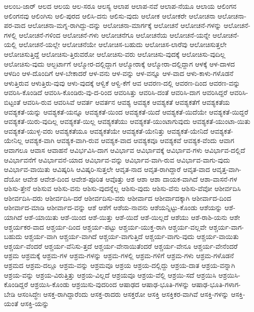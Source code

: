 {ಆಲಂಬ-ಜಾರ್
ಆಲದ
ಆಲಯ
ಆಲ-ಸರೂ
ಆಲಸ್ಯ
ಆಲಾಪ
ಆಲಾಪ-ನವೆ
ಆಲಾಪ-ನೆಯೂ
ಆಲಾಯ
ಆಲಿಂಗನ
ಆಲಿಂಗನವು
ಆಲಿಂಗಿಸು
ಆಲಿ-ಪುರದ
ಆಲಿಸಿ-ದನು
ಆಲಿಸು-ವುದು
ಆಲೋಕ
ಆಲೋಕರೇ
ಆಲೋಚನಾ
ಆಲೋಚನಾ-ಪರ-ವಾದ
ಆಲೋಚನಾ-ಮಗ್ನ-ರಾಗಿದ್ದು-ದನ್ನು
ಆಲೋಚನಾ-ಮಾರ್ಗಕ್ಕೆ
ಆಲೋಚನೆ
ಆಲೋಚನೆ-ಗಳನ್ನು
ಆಲೋಚನೆ-ಗಳಲ್ಲಿ
ಆಲೋಚನೆ-ಗಳಿಂದ
ಆಲೋಚನೆ-ಗಳು
ಆಲೋಚನೆಗೂ
ಆಲೋಚನೆಯ
ಆಲೋಚನೆ-ಯನ್ನೇ
ಆಲೋಚನೆ-ಯಲ್ಲಿ
ಆಲೋಚನೆ-ಯಲ್ಲೇ
ಆಲೋಚನೆಯೇ
ಆಲೋಚಿಸ-ಬಹುದು
ಆಲೋಚಿಸ-ಲಾರೆವು
ಆಲೋಚಿಸುತ್ತಲೇ
ಆಲೋಚಿಸುತ್ತಿದ್ದೆ
ಆಲೋಚಿಸು-ತ್ತಿರುವರೋ
ಆಲೋಚಿಸು-ವರು
ಆಲೋಚಿಸು-ವುದಕ್ಕೆ
ಆಲೋಚಿಸು-ವುದಿಲ್ಲ
ಆಲೋಚಿಸು-ವುದು
ಆಲ್ಬರ್ಟಾಗೆ
ಆಲ್ಮೋರ-ದಲ್ಲಿದ್ದಾಗ
ಆಲ್ಮೋರಾಕ್ಕೆ
ಆಲ್ಮೋರಾ-ದಲ್ಲಿದ್ದಾಗ
ಆಳಕ್ಕೆ
ಆಳ-ದಾಳದ
ಆಳದಿಂ
ಆಳ-ದೊಂದಿಗೆ
ಆಳ-ಬೇಕಾದರೆ
ಆಳ-ವನು
ಆಳ-ವನ್ನು
ಆಳ-ವನ್ನೂ
ಆಳ-ವಾದ
ಆಳು-ಕಾಳು-ಗಳೊಡನೆ
ಆಳುತ್ತಿರುವ
ಆಳುತ್ತಿರು-ವುವು
ಆಳು-ವುದಕ್ಕೆ
ಆಳ್ವಿಕೆ
ಆಳ್ವಿ-ಕೆಗೆ
ಆವ
ಆವರಣ-ದಲ್ಲಿ
ಆವರಣ-ದಿಂದ
ಆವರಣ-ವನ್ನು
ಆವರಿಸಿ-ಕೊಂಡಿದೆ
ಆವರಿಸಿ-ಕೊಂಡಿರು-ವು-ದ-ರಿಂದ
ಆವರಿಸಿತ್ತು
ಆವರಿಸಿ-ದಂತೆ
ಆವರಿಸಿ-ದಾಗ
ಆವರಿಸಿದ್ದರೆ
ಆವರಿಸಿ-ಬಿಟ್ಟಂತೆ
ಆವರಿಸಿ-ರುವ
ಆವರಿಸಿವೆ
ಆವರ್ತ
ಆವರ್ತನ
ಆವಶ್ಯ
ಆವಶ್ಯಕ
ಆವಶ್ಯಕತೆ
ಆವಶ್ಯಕತೆಗೆ
ಆವಶ್ಯಕತೆಯ
ಆವಶ್ಯಕತೆ-ಯನ್ನು
ಆವಶ್ಯಕತೆ-ಯನ್ನೂ
ಆವಶ್ಯಕತೆ-ಯಿಂದ
ಆವಶ್ಯಕತೆ-ಯಿದೆ
ಆವಶ್ಯಕತೆ-ಯಿದೆಯೇ
ಆವಶ್ಯಕತೆ-ಯಿದ್ದರೆ
ಆವಶ್ಯಕತೆ-ಯಿರು-ವುದಿಲ್ಲ
ಆವಶ್ಯಕತೆ-ಯಿಲ್ಲ
ಆವಶ್ಯಕತೆಯು
ಆವಶ್ಯಕತೆ-ಯುಂಟಾಗುವುದು
ಆವಶ್ಯಕತೆ-ಯುಂಟಾ-ಯಿತು
ಆವಶ್ಯಕತೆ-ಯುಳ್ಳ-ವರು
ಆವಶ್ಯಕತೆಯೂ
ಆವಶ್ಯಕತೆಯೇ
ಆವಶ್ಯಕತೆ-ಯೇನಿತ್ತು
ಆವಶ್ಯಕತೆ-ಯೇನಿದೆ
ಆವಶ್ಯಕತೆ-ಯೇನಿಲ್ಲ
ಆವಶ್ಯಕ-ವಾಗಿ
ಆವಶ್ಯಕ-ವಾಗಿ-ರುವ
ಆವಶ್ಯಕ-ವಾದ
ಆವಶ್ಯಕವೂ
ಆವಶ್ಯಕವೆ
ಆವಶ್ಯಕ-ವೆಂದು
ಆವಾಗ
ಆವಾಗಲೂ
ಆವಾಸ
ಆವಾಹನೆ
ಆವಿರ್ಭವಿಸಿ-ದಾಗ
ಆವಿರ್ಭಾವ
ಆವಿರ್ಭಾವಕ್ಕೆ
ಆವಿರ್ಭಾವ-ಗಳು
ಆವಿರ್ಭಾವ-ದಲ್ಲಿದೆ
ಆವಿರ್ಭಾವನೆಗೆ
ಆವಿರ್ಭಾವನೆ-ಯಾದ
ಆವಿರ್ಭಾವ-ವನ್ನು
ಆವಿರ್ಭಾವ-ವಾಗಿ-ರುವ
ಆವಿರ್ಭಾವ-ವಾಗು-ವುದು
ಆವಿರ್ಭಾವ-ವಾಯಿತು
ಆವಿಷ್ಕರಿಸಿ
ಆವಿಷ್ಕರಿ-ಸುತ್ತಲೇ
ಆವೃತ-ನಾದ
ಆವೃತ-ರಾಗಿದ್ದಾರೆ
ಆವೃತ-ವಾದ
ಆವೃತ್ತ-ವಾಗಿ-ದೆಯೋ
ಆವೇಶ
ಆವೇಶ-ದಿಂದ
ಆವೇಶ-ಪೂರಿತ
ಆವೊತ್ತು
ಆಶ
ಆಶಾ
ಆಶಾ ದಾಯಕ-ವಾಗಿದೆ
ಆಶಾ-ವಾಸನೆ-ಗಳ
ಆಶಿಸು-ತ್ತೇನೆ
ಆಶಿಸುವ
ಆಶಿಸು-ವನು
ಆಶಿಸು-ವುದನ್ನೆಲ್ಲ
ಆಶಿಸು-ವುದು
ಆಶಿಸು-ವೆನು
ಆಶಿಸು-ವೆವೋ
ಆಶೀರ್ವದಿಸಿ
ಆಶೀರ್ವದಿಸಿ-ದರು
ಆಶೀರ್ವದಿಸಿ-ದರೆ
ಆಶೀರ್ವದಿಸು-ವರು
ಆಶೀರ್ವಾದ
ಆಶೀರ್ವಾದಕ್ಕಾಗಿ
ಆಶೀರ್ವಾದ-ದಿಂದ
ಆಶೀರ್ವಾದ-ಮಾಡಿ
ಆಶೀರ್ವಾದ-ವನ್ನು
ಆಶೆ
ಆಶೆಗೆ
ಆಶೆಯ-ನಾವನು
ಆಶೆಯನ್ನಿಟ್ಟು-ಕೊಂಡು
ಆಶೆಯನ್ನು
ಆಶೆ-ಯಾಗಿದೆ
ಆಶೆ-ಯಾಯಿತು
ಆಶೆ-ಯಿಂದ
ಆಶೆ-ಯಿತ್ತು
ಆಶೆ-ಯಿದೆ
ಆಶೆ-ಯಿಲ್ಲದೆ
ಆಶೆಯು
ಆಶೆ-ರಾಶಿ-ಯನು
ಆಶೇ
ಆಶ್ಚರ್ಯಕರ-ವಾದ
ಆಶ್ಚರ್ಯ-ದಿಂದ
ಆಶ್ಚರ್ಯ-ಪಟ್ಟು
ಆಶ್ಚರ್ಯ-ಯುಕ್ತ-ರಾಗಿ
ಆಶ್ಚರ್ಯ-ವಲ್ಲವೇ
ಆಶ್ಚರ್ಯ-ವಾಗ-ಬಹುದು
ಆಶ್ಚರ್ಯ-ವಾಗಿ
ಆಶ್ಚರ್ಯ-ವಾಗಿದೆ
ಆಶ್ಚರ್ಯ-ವಾಗುತ್ತಿದೆ
ಆಶ್ಚರ್ಯ-ವಾಗು-ವುದು
ಆಶ್ಚರ್ಯ-ವಾಯಿತು
ಆಶ್ಚರ್ಯ-ವೆಂದರೆ
ಆಶ್ಚರ್ಯ-ವೆನಿಸು-ತ್ತದೆ
ಆಶ್ಚರ್ಯ-ವೇನಾಯಿತೆಂದರೆ
ಆಶ್ಚರ್ಯ-ವೇನೂ
ಆಶ್ಚರ್ಯ-ವೇನೆಂದರೆ
ಆಶ್ರಮ
ಆಶ್ರಮಕ್ಕೆ
ಆಶ್ರಮ-ಗಳ
ಆಶ್ರಮ-ಗಳನ್ನು
ಆಶ್ರಮ-ಗಳಲ್ಲಿ
ಆಶ್ರಮ-ಗಳಿಗೆ
ಆಶ್ರಮ-ಗಳು
ಆಶ್ರಮ-ಗಳೊಡನೆ
ಆಶ್ರಮದ
ಆಶ್ರಮ-ದಲ್ಲೂ
ಆಶ್ರಮ-ವನ್ನು
ಆಶ್ರಮವೂ
ಆಶ್ರಯ
ಆಶ್ರಯ-ದಲ್ಲಿದ್ದು
ಆಶ್ರಯ-ದಾತ
ಆಶ್ರಯ-ವನ್ನಾಗಿ
ಆಶ್ರಯ-ವನ್ನು
ಆಶ್ರಯ-ವಿರುತ್ತಿತ್ತು
ಆಶ್ರಯ-ವಿಲ್ಲದೆ
ಆಶ್ರಯವೂ
ಆಶ್ರಯ-ವೆಲ್ಲಿ
ಆಶ್ರಯಿ-ಸದೆ
ಆಶ್ರಯಿಸಿ
ಆಶ್ರಯಿಸಿ-ಕೊಂಡಿದ್ದರೆ
ಆಶ್ರಯಿಸಿ-ಕೊಂಡು
ಆಶ್ರಯಿಸು-ವುದರಿಂದ
ಆಷಾಢದ
ಆಷಾಢ-ಭೂತಿ-ಗಳನ್ನು
ಆಷಾಢ-ಭೂತಿ-ಗಳಾಗ-ಬೇಡಿ
ಆಸಂಸಿದ್ಧೇಃ
ಆಸಕ್ತ-ರಾಗಿದ್ದಾರೆಂದು
ಆಸಕ್ತ-ರಾದರು
ಆಸಕ್ತರೋ
ಆಸಕ್ತಿ
ಆಸಕ್ತಿಕರ-ವಾಗಿವೆ
ಆಸಕ್ತಿ-ಗಳನ್ನು
ಆಸಕ್ತಿ-ಯಂತೆ
ಆಸಕ್ತಿ-ಯನ್ನು
}
